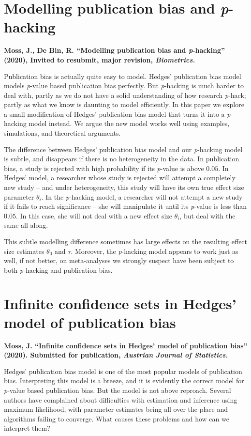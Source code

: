 \section{Modelling publication bias and \emph{p}-hacking}
\textbf{Moss, J., De Bin, R. ``Modelling publication bias and \emph{p}-hacking''
(2020), Invited to resubmit, major revision, \emph{Biometrics.}}

Publication bias is actually quite easy to model. Hedges' publication bias model \parencite{Hedges1992-ue} models \textit{p}-value based publication bias perfectly. But \textit{p}-hacking is much harder to deal with, partly as we do not have a solid understanding of how research \textit{p}-hack; partly as what we know is daunting to model efficiently. In this paper we explore a small modification of Hedges' publication bias model that turns it into a \textit{p}-hacking model instead. We argue the new model works well using examples, simulations, and theoretical arguments. 

The difference between Hedges' publication bias model and our \textit{p}-hacking model is subtle, and disappears if there is no heterogeneity in the data. In publication bias, a study is rejected with high probability if its \textit{p}-value is above $0.05$. In Hedges' model, a researcher whose study is rejected will attempt a completely new study -- and under heterogeneity, this study will have its own true effect size parameter $\theta_i$. In the \textit{p}-hacking model, a researcher will not attempt a new study if it fails to reach significance -- she will manipulate it until its \textit{p}-value is less than $0.05$. In this case, she will not deal with a new effect size $\theta_i$, but deal with the same all along.

This subtle modelling difference sometimes has large effects on the resulting effect size estimates $\theta_0$ and $\tau$. Moreover, the \textit{p}-hacking model appears to work just as well, if not better, on meta-analyses we strongly suspect have been subject to both \textit{p}-hacking and publication bias.

\section{Infinite confidence sets in Hedges' model of publication
bias}
\textbf{Moss, J. ``Infinite confidence sets in Hedges' model of publication
bias'' (2020). Submitted for publication, \emph{Austrian Journal of Statistics.}
}

Hedges' publication bias model is one of the most popular models of publication bias. Interpreting this model is a breeze, and it is evidently the correct model for \textit{p}-value based publication bias. But the model is not above reproach. Several authors have complained about difficulties with estimation and inference using maximum likelihood, with parameter estimates being all over the place and algorithms failing to converge. What causes these problems and how can we interpret them?


